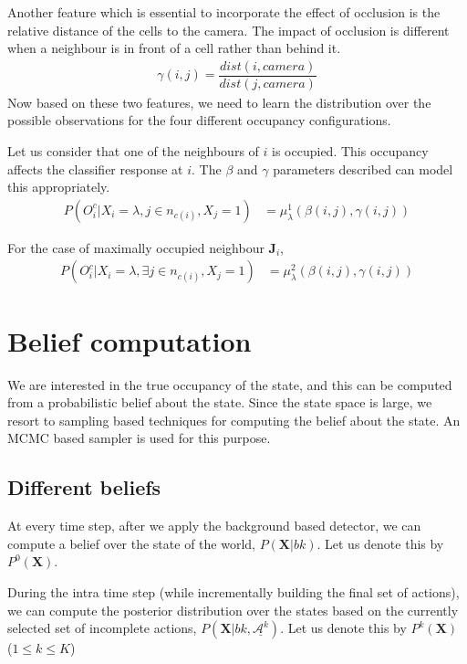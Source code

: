 \documentclass[10pt,twocolumn,letterpaper]{article}
\begin{document}
Another feature which is essential to incorporate the effect of occlusion is the relative distance of the cells to the camera. 
The impact of occlusion is different when a neighbour is in front of a cell rather than behind it. 
\begin{align}
\gamma(i,j) = \dfrac{dist(i,camera)}{dist(j,camera)}
\end{align}
Now based on these two features, we need to learn the distribution over the possible observations for the four different occupancy configurations.  


Let us consider that one of the neighbours of $ i$ is occupied. This occupancy affects the classifier response at $ i$. The $\beta$ and $\gamma$ parameters described can model this appropriately.
 \begin{align}
 P(O^{c}_{i} |X_{i}=\lambda , j \in{n_{c(i)}},X_{j} =1)  &=\mu^{1}_{\lambda}(\beta(i,j),\gamma(i,j))
\end{align}


For the case of maximally occupied neighbour $ \textbf{J}_{i} $, 
\begin{align}
 P(O^{c}_{i} |X_{i}=\lambda ,\exists j  \in{n_{c(i)}},X_{j} =1)  &=\mu^{2}_{\lambda}(\beta(i,j),\gamma(i,j))
\end{align}

\section{Belief computation}
We are interested in the true occupancy of the state, and this can be computed from a probabilistic belief about the state. Since the state space is large, we resort to sampling based techniques for computing the belief about the state. An MCMC based sampler is used for this purpose.


\subsection{Different beliefs}

At every time step, after we apply the background based detector, we can compute a belief over the state of the world, $P(\textbf{X}|bk)$. Let us denote this by $ P^{0}(\textbf{X})$. 

During the intra time step (while incrementally building the final set of actions), we can compute the posterior distribution over the states based on the currently selected set of incomplete actions, $ P(\textbf{X}|bk,\underline{\mathcal{A}^{k}} )$. Let us denote this by $ P^{k}(\textbf{X})$ ($1 \leq k \leq K $)
\end{document}
